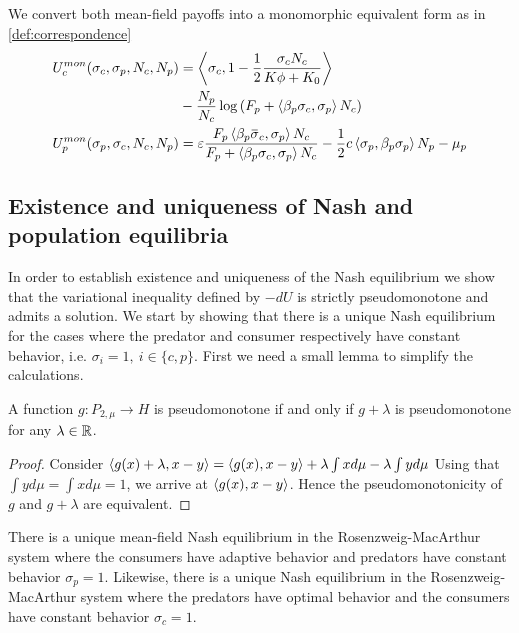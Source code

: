 We convert both mean-field payoffs into a monomorphic equivalent form as in \cref{def:correspondence}
\begin{align}
  \label{eq:mon_eq_forms}
  U_c^{mon}(\sigma_c, \sigma_p, N_c, N_p) &= \ip{\sigma_c}{1-\frac{1}{2}\frac{\sigma_c N_c}{K\phi + K_0}}\\ &- \frac{N_p}{N_c}\log\pa{F_p + \ip{\beta_p \sigma_c}{\sigma_p} N_c} \\
  U_p^{mon}(\sigma_p, \sigma_c, N_c, N_p) &= \epsilon \frac{F_p \ip{\beta_p \overbar{\sigma}_c}{\sigma_p} N_c}{F_p + \ip{\beta_p \sigma_c}{\sigma_p} N_c} - \frac{1}{2}c \ip{\sigma_p}{\beta_p \sigma_p}N_p  - \mu_p
\end{align}
\subsection{Existence and uniqueness of Nash and population equilibria}
In order to establish existence and uniqueness of the Nash equilibrium we show that the variational inequality defined by $-dU$ is strictly pseudomonotone and admits a solution. We start by showing that there is a unique Nash equilibrium for the cases where the predator and consumer respectively have constant behavior, i.e. $\sigma_i = 1,~i\in \{c,p\}$. First we need a small lemma to simplify the calculations.
\begin{lemma}
  \label{lem:pseudo_reduc}
  A function $g: P_{2,\mu} \to H$ is pseudomonotone if and only if $g+\lambda$ is pseudomonotone for any $\lambda \in \mathbb{R}$.
\end{lemma}
\begin{proof}
  Consider $\left \langle g(x)+\lambda,x-y \right \rangle=\left \langle g(x),x-y \right \rangle+\lambda \int x d\mu - \lambda \int y d\mu$
  Using that $\int y d\mu = \int x d\mu = 1$, we arrive at  $\left \langle g(x),x-y \right \rangle$.
  Hence the pseudomonotonicity of $g$ and $g+\lambda$ are equivalent.
\end{proof}
\begin{proposition}
  There is a unique mean-field Nash equilibrium in the Rosenzweig-MacArthur system where the consumers have adaptive behavior and predators have constant behavior $\sigma_p = 1$.
  Likewise, there is a unique Nash equilibrium in the Rosenzweig-MacArthur system where the predators have optimal behavior and the consumers have constant behavior $\sigma_c = 1$.
\end{proposition}
